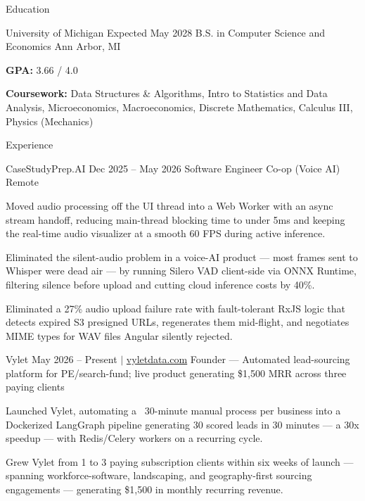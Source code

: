 \documentclass[
	11pt
]{../../../template}
\begin{document}
	\begin{rSection}{E}{ducation}
		\begin{rSectionEntry}
			{University of Michigan}
			{Expected May 2028}
			{B.S. in Computer Science and Economics}
			{}
			{Ann Arbor, MI}

			\item \textbf{GPA:} 3.66 / 4.0
			\item \textbf{Coursework:} Data Structures \& Algorithms, Intro to Statistics and Data Analysis, Microeconomics, Macroeconomics, Discrete Mathematics, Calculus III, Physics (Mechanics)
		\end{rSectionEntry}
	\end{rSection}

	\begin{rSection}{E}{xperience}
		\begin{rSectionEntry}
			{CaseStudyPrep.AI}
			{Dec 2025 -- May 2026}
			{Software Engineer Co-op (Voice AI)}
			{}
			{Remote}

			\item Moved audio processing off the UI thread into a Web Worker with an async stream handoff, reducing main-thread blocking time to under 5ms and keeping the real-time audio visualizer at a smooth 60 FPS during active inference.
			\item Eliminated the silent-audio problem in a voice-AI product --- most frames sent to Whisper were dead air --- by running Silero VAD client-side via ONNX Runtime, filtering silence before upload and cutting cloud inference costs by 40\%.
			\item Eliminated a 27\% audio upload failure rate with fault-tolerant RxJS logic that detects expired S3 presigned URLs, regenerates them mid-flight, and negotiates MIME types for WAV files Angular silently rejected.
		\end{rSectionEntry}

		\begin{rSectionEntry}
			{Vylet}
			{May 2026 -- Present $\vert$ \href{https://vyletdata.com}{vyletdata.com}}
			{Founder --- Automated lead-sourcing platform for PE/search-fund; live product generating \$1,500 MRR across three paying clients}
			{}
			{}

			\item Launched Vylet, automating a ~30-minute manual process per business into a Dockerized LangGraph pipeline generating 30 scored leads in 30 minutes --- a 30x speedup --- with Redis/Celery workers on a recurring cycle.
			\item Grew Vylet from 1 to 3 paying subscription clients within six weeks of launch --- spanning workforce-software, landscaping, and geography-first sourcing engagements --- generating \$1,500 in monthly recurring revenue.
		\end{rSectionEntry}
	\end{rSection}
\end{document}
